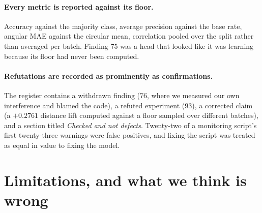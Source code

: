 \documentclass[11pt,a4paper]{article}
\begin{document}
\paragraph{Every metric is reported against its floor.} Accuracy against
the majority class, average precision against the base rate, angular MAE
against the circular mean, correlation pooled over the split rather than
averaged per batch. Finding 75 was a head that looked like it was
learning because its floor had never been computed.

\paragraph{Refutations are recorded as prominently as confirmations.}
The register contains a withdrawn finding (76, where we measured our own
interference and blamed the code), a refuted experiment (93), a
corrected claim (a $+0.2761$ distance lift computed against a floor
sampled over different batches), and a section titled \emph{Checked and
not defects}. Twenty-two of a monitoring script's first twenty-three
warnings were false positives, and fixing the script was treated as
equal in value to fixing the model.

\section{Limitations, and what we think is wrong}
\end{document}
